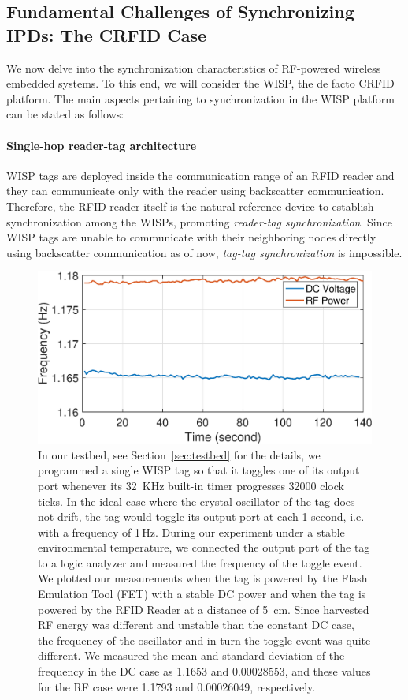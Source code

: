 \documentclass[journal,draftcls,onecolumn,12pt,twoside]{IEEEtranTCOM}
\begin{document}
\subsection{Fundamental Challenges of Synchronizing IPDs: The CRFID Case}
\label{sec:CRFIDs}

We now delve into the synchronization characteristics of RF-powered wireless embedded systems. To this end, we will consider the WISP, the de facto CRFID platform. The main aspects pertaining to synchronization in the WISP platform can be stated as follows:

\paragraph{Single-hop reader-tag architecture} WISP tags are deployed inside the communication range of an RFID reader and they can communicate only with the reader using backscatter communication. Therefore, the RFID reader itself is the natural reference device to establish synchronization among the WISPs, promoting \emph{reader-tag synchronization}. Since WISP tags are unable to communicate with their neighboring nodes directly using backscatter communication as of now, \emph{tag-tag synchronization} is impossible.

\begin{figure}
	\centering
	\includegraphics[scale=0.35]{figures/clock_frequency_dc_rf.eps}
	\caption{\label{fig:frequency_dc_rf} In our testbed, see Section~\ref{sec:testbed} for the details, we programmed a single WISP tag so that it toggles one of its output port whenever its 32~KHz built-in timer progresses 32000 clock ticks. In the ideal case where the crystal oscillator of the tag does not drift, the tag would toggle its output port at each 1 second, i.e. with a frequency of 1\,Hz. During our experiment under a stable environmental temperature, we connected the output port of the tag to a logic analyzer and measured the frequency of the toggle event. We plotted our measurements when the tag is powered by the Flash Emulation Tool (FET) with a stable DC power and when the tag is powered by the RFID Reader at a distance of 5~cm. Since harvested RF energy was different and unstable than the constant DC case, the frequency of the oscillator and in turn the toggle event was quite different. We measured the mean and standard deviation of the frequency in the DC case as 1.1653 and 0.00028553, and these values for the RF case were 1.1793 and 0.00026049, respectively. }
\end{figure}
\end{document}
